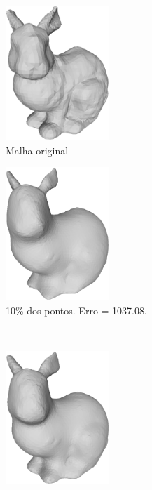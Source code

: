 \begin{figure}[H]
	\centering
	\begin{subfigure}[b]{0.47\textwidth}
		\centering
		\includegraphics[width=0.43\textwidth]{img/res/bunny_all.eps}
		\caption{Malha original}
		\label{fig:ex41}
	\end{subfigure}
	\hfill
	\begin{subfigure}[b]{0.47\textwidth}
		\centering
		\includegraphics[width=0.43\textwidth]{img/res/bunny_10.eps}
		\caption{10\% dos pontos. Erro = 1037.08.}
		\label{fig:ex42}
	\end{subfigure}
	\\
	\begin{subfigure}[b]{0.47\textwidth}
		\centering
		\includegraphics[width=0.43\textwidth]{img/res/bunny_30.eps}

\end{subfigure}
\end{figure}
